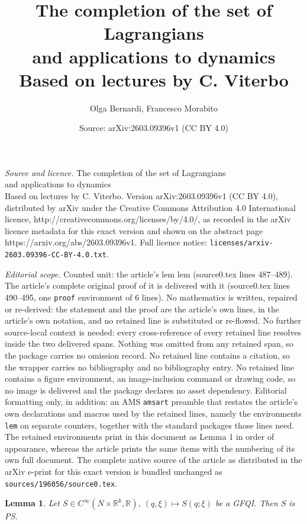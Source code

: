 \documentclass[10pt,a4paper]{amsart}
\title{The completion of the set of Lagrangians \\ and applications to dynamics \\ \Large Based on lectures by C. Viterbo}
\author{Olga Bernardi, Francesco Morabito}
\date{Source: arXiv:2603.09396v1 (CC BY 4.0)}
\newtheorem{lem}{Lemma}
\begin{document}
\maketitle

\noindent\emph{Source and licence.} The completion of the set of Lagrangians \\ and applications to dynamics \\ \Large Based on lectures by C. Viterbo. Version arXiv:2603.09396v1 (CC BY 4.0), distributed by arXiv under the Creative Commons Attribution 4.0 International licence, http://creativecommons.org/licenses/by/4.0/, as recorded in the arXiv licence metadata for this exact version and shown on the abstract page https://arxiv.org/abs/2603.09396v1. Full licence notice: \texttt{licenses/arxiv-2603.09396-CC-BY-4.0.txt}.\par\smallskip

\noindent\textit{Editorial scope.} Counted unit: the article's lem lem (source0.tex lines 487--489). The article's complete original proof of it is delivered with it (source0.tex lines 490--495, one \texttt{proof} environment of 6 lines). No mathematics is written, repaired or re-derived: the statement and the proof are the article's own lines, in the article's own notation, and no retained line is substituted or re-flowed.  No further source-local context is needed: every cross-reference of every retained line resolves inside the two delivered spans.  Nothing was omitted from any retained span, so the package carries no omission record.  No retained line contains a citation, so the wrapper carries no bibliography and no bibliography entry.  No retained line contains a figure environment, an image-inclusion command or drawing code, so no image is delivered and the package declares no asset dependency.  Editorial formatting only, in addition: an AMS \texttt{amsart} preamble that restates the article's own declarations and macros used by the retained lines, namely the environments \texttt{lem} on separate counters, together with the standard packages those lines need.  The retained environments print in this document as Lemma 1 in order of appearance, whereas the article prints the same items with the numbering of its own full document.  The complete native source of the article as distributed in the arXiv e-print for this exact version is bundled unchanged as \texttt{sources/196056/source0.tex}.
\begin{lem}
Let $S\in C^{\infty}(N \times \mathbb{R}^k,\mathbb{R})$, $(q,\xi) \mapsto S(q;\xi)$ be a GFQI. Then $S$ is PS.
\end{lem}
\end{document}
